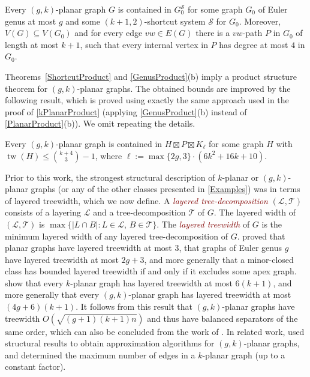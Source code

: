 \documentclass{patmorin}
\newcommand{\defin}[1]{\textcolor{Maroon}{\emph{#1}}}
\newcommand{\note}[2]{\noindent{\color{red}[#1:~#2]}}
\DeclareMathOperator{\tw}{tw}
\renewcommand{\SS}{\mathcal{S}}
\renewcommand{\leq}{\leqslant}
\begin{document}
\begin{obs}
\label{gAddDummy}
Every $(g,k)$-planar graph $G$ is contained in $G_0^\SS$ for some graph $G_0$ of Euler genus at most $g$ and some $(k+1,2)$-shortcut system $\SS$ for $G_0$. Moreover, $V(G) \subseteq V(G_0)$ and for every edge $vw \in E(G)$ there is a $vw$-path $P$ in $G_0$ of length at most $k+1$, such that every internal vertex in $P$ has degree at most $4$ in $G_0$.
\end{obs}

Theorems~\ref{ShortcutProduct}  and \ref{GenusProduct}(b) imply a product structure theorem for $(g,k)$-planar graphs. The obtained bounds are improved by the following result, which is proved using exactly the same approach used in the proof of \cref{kPlanarProduct} (applying \cref{GenusProduct}(b) instead of \cref{PlanarProduct}(b)). We omit repeating the details.

\begin{thm}
\label{gkPlanarProduct}
Every $(g,k)$-planar graph is contained in $H\boxtimes P \boxtimes K_\ell$ for some graph $H$ with $\tw(H) \leq \binom{k+4}{3}-1$, where $\ell:=\max\{2g,3\}\cdot(6k^2+16k+10)$.
\note{DW}{I have changed $\tw(H) \leq \binom{k+5}{4}-1$ to $\tw(H) \leq \binom{k+4}{3}-1$, okay?}
\end{thm}

Prior to this work, the strongest structural description of $k$-planar or $(g,k)$-planar graphs (or any of the other classes presented in \cref{Examples}) was in terms of layered treewidth, which we now define.  A \defin{layered tree-decomposition} $(\mathcal{L},\mathcal{T})$ consists of a layering $\mathcal{L}$ and a tree-decomposition $\mathcal{T}$ of $G$. The layered width of $(\mathcal{L},\mathcal{T})$ is $\max\{|L\cap B|: L\in \mathcal{L},\, B\in \mathcal{T}\}$.  The \defin{layered treewidth} of $G$ is the minimum layered width of any layered tree-decomposition of $G$. \citet{dujmovic.morin.ea:layered} proved that planar graphs have layered treewidth at most 3, that graphs of Euler genus $g$ have layered treewidth at most $2g+3$, and more generally that a minor-closed class has bounded layered treewidth if and only if it excludes some apex graph. \citet{dujmovic.eppstein.ea:structure} show that every $k$-planar graph has layered treewidth at most $6(k+1)$, and more generally that every $(g,k)$-planar graph has layered treewidth at most $(4g+6)(k+1)$. It follows from this result that $(g,k)$-planar graphs have treewidth $O(\sqrt{(g+1)(k+1)n})$ and thus have balanced separators of the same order, which can also be concluded from the work of \citet{FP08}. In related work, \citet{grigoriev.bodlaender:algorithms} used structural results to obtain approximation algorithms for $(g,k)$-planar graphs, and \citet{PachToth97} determined the maximum number of edges in a $k$-planar graph (up to a constant factor).
\end{document}
